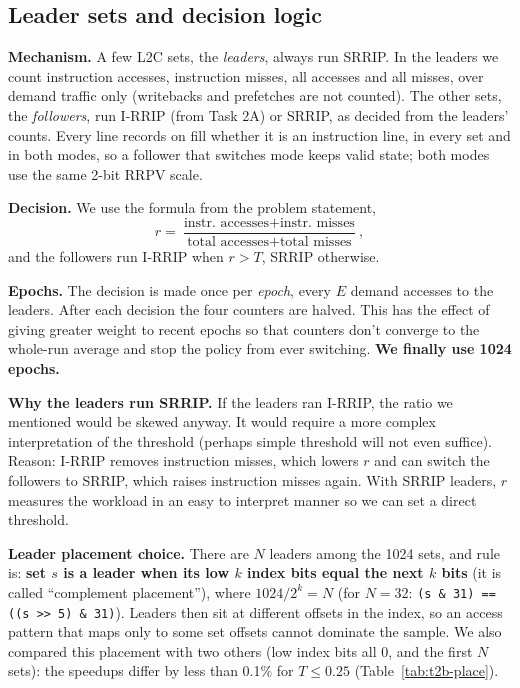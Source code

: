 
\subsection{Leader sets and decision logic}

\textbf{Mechanism.} A few L2C sets, the \emph{leaders}, always run SRRIP. In the leaders we count instruction accesses, instruction misses, all accesses and all misses, over demand traffic only (writebacks and prefetches are not counted). The other sets, the \emph{followers}, run I-RRIP (from Task 2A) or SRRIP, as decided from the leaders' counts. Every line records on fill whether it is an instruction line, in every set and in both modes, so a follower that switches mode keeps valid state; both modes use the same 2-bit RRPV scale.

\textbf{Decision.} We use the formula from the problem statement,
\[
  r = \frac{\text{instr.\ accesses} + \text{instr.\ misses}}{\text{total accesses} + \text{total misses}},
\]
and the followers run I-RRIP when $r > T$, SRRIP otherwise.

\textbf{Epochs.} The decision is made once per \emph{epoch}, every $E$ demand accesses to the leaders. After each decision the four counters are halved. This has the effect of giving greater weight to recent epochs so that counters don't converge to the whole-run average and stop the policy from ever switching. \textbf{We finally use 1024 epochs.}

\textbf{Why the leaders run SRRIP.} If the leaders ran I-RRIP, the ratio we mentioned would be skewed anyway. It would require a more complex interpretation of the threshold (perhaps simple threshold will not even suffice). Reason: I-RRIP removes instruction misses, which lowers $r$ and can switch the followers to SRRIP, which raises instruction misses again. With SRRIP leaders, $r$ measures the workload in an easy to interpret manner so we can set a direct threshold.

\textbf{Leader placement choice.} There are $N$ leaders among the 1024 sets, and rule is: \textbf{set $s$ is a leader when its low $k$ index bits equal the next $k$ bits} (it is called ``complement placement''), where $1024/2^k = N$ (for $N = 32$: \texttt{(s \& 31) == ((s >> 5) \& 31)}). Leaders then sit at different offsets in the index, so an access pattern that maps only to some set offsets cannot dominate the sample. We also compared this placement with two others (low index bits all 0, and the first $N$ sets): the speedups differ by less than 0.1\% for $T \le 0.25$ (Table~\ref{tab:t2b-place}).

